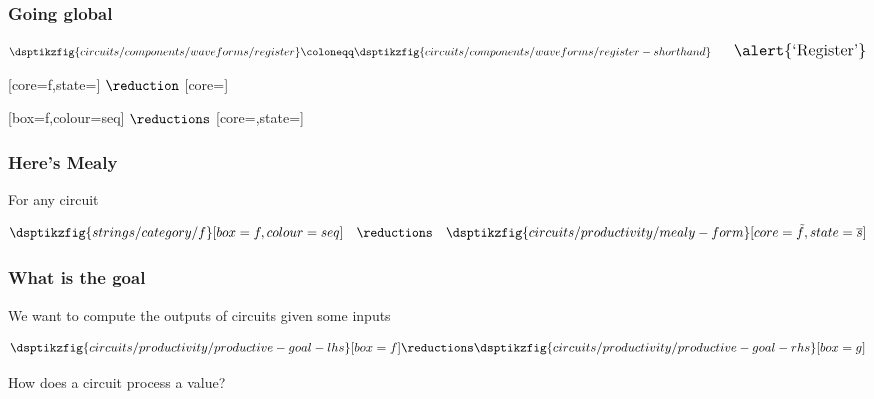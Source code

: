 \begin{frame}
    \frametitle{Going global}

    \centering
    \Large

    \await

    \normalsize
    \begin{gather*}
        \dsptikzfig{circuits/components/waveforms/register}
        \coloneqq
        \dsptikzfig{circuits/components/waveforms/register-shorthand}
        \qquad
        \Large
        \text{\alert{`Register'}}
    \end{gather*}

    \vspace{1em}

    \await

    [core=f,state=]
    \Large\(\reduction\)\normalsize
    [core=]

    \await

    [box=f,colour=seq]
    \Large\(\reductions\)\normalsize
    [core=,state=]

\end{frame}
\begin{frame}
    \frametitle{Here's Mealy}

    \centering
    \Large
    For \alert{any} circuit
    \normalsize

    \[
        \dsptikzfig{strings/category/f}[box=f,colour=seq]
        \quad
        \reductions
        \quad
        \dsptikzfig{circuits/productivity/mealy-form}[core=\tilde{f},state=\overline{s}]
    \]

\end{frame}
\begin{frame}
    \frametitle{What is the goal}

    \centering

    \await
    \Large
    We want to compute the \alert{outputs} of circuits given some \alert{inputs}
    \normalsize

    \begin{gather*}
        \dsptikzfig{circuits/productivity/productive-goal-lhs}[box=f]
        \reductions
        \dsptikzfig{circuits/productivity/productive-goal-rhs}[box=g]
    \end{gather*}

    \await

    \vspace{1em}

    \Large

    How does a circuit \alert{process} a value?

\end{frame}
